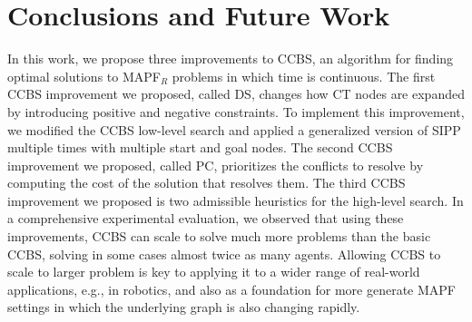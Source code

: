 \documentclass[letterpaper]{article} %
\newcommand{\ccbs}{\ac{CCBS}\xspace}
\newcommand{\ct}{\ac{CT}\xspace}
\newcommand{\sipp}{\ac{SIPP}\xspace}
\newcommand{\mapfr}{{MAPF}$_R$\xspace}
\newcommand{\mapf}{\ac{MAPF}\xspace}
\newcommand{\pc}{\ac{PC}\xspace}
\newcommand{\ds}{\ac{DS}\xspace}
\begin{document}
\section{Conclusions and Future Work}
In this work, we propose three improvements to \ccbs, an algorithm for finding optimal solutions to \mapfr problems in which time is continuous. 
The first \ccbs improvement we proposed, called \ds, changes how \ct nodes are expanded by introducing positive and negative constraints. 
To implement this improvement, we modified the \ccbs low-level search and applied a generalized version of \sipp multiple times with multiple start and goal nodes. 
The second \ccbs improvement we proposed, called \pc, prioritizes the conflicts to resolve by computing the cost of the solution that resolves them. 
The third \ccbs improvement we proposed is two admissible heuristics for the high-level search. 
In a comprehensive experimental evaluation, we observed that using these improvements, \ccbs can scale to solve much more problems than the basic \ccbs, solving in some cases almost twice as many agents. 
Allowing \ccbs to scale to larger problem is key to applying it to a wider range of real-world applications, e.g., in robotics, and also as a foundation for more generate \mapf settings in which the underlying graph is also changing rapidly. 




\end{document}
